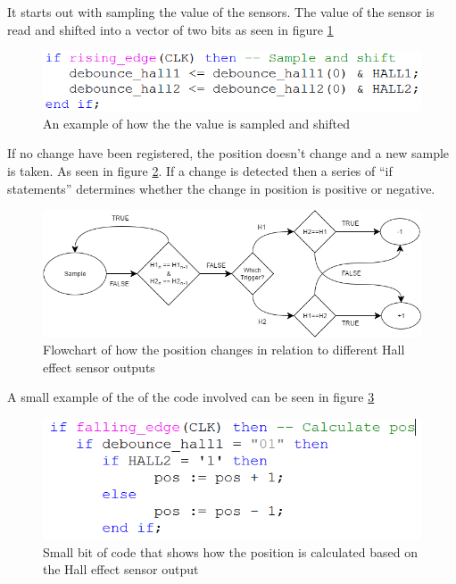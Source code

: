 It starts out with sampling the value of the sensors. The value of the sensor is read and shifted into a vector of two bits as seen in figure \ref{fig:Shift code pos}

\begin{figure}[h!]
\centering
\includegraphics[scale=0.5]{Billeder/FPGA/Shift_code_example.png}
\caption{ An example of how the the value is sampled and shifted }
\label{fig:Shift code pos}
\end{figure}


If no change have been registered, the position doesn't change and a new sample is taken. As seen in figure \ref{fig:Pos_change_flowchart}. If a change is detected then a series of “if statements” determines whether the change in position is positive or negative.

\begin{figure}[h!]
\centering
\includegraphics[scale=0.5]{Billeder/FPGA/Pos_change_flowchart.png}
\caption{ Flowchart of how the position changes in relation to different Hall effect sensor outputs }
\label{fig:Pos_change_flowchart}
\end{figure}

A small example of the of the code involved can be seen in figure \ref{fig:Pos_change_code_example}

\begin{figure}[h!]
\centering
\includegraphics[scale=0.5]{Billeder/FPGA/Calculate_pos_code_example.png}
\caption{ Small bit of code that shows how the position is calculated based on the Hall effect sensor output }
\label{fig:Pos_change_code_example}
\end{figure}

